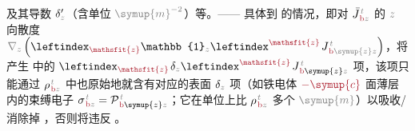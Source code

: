 及其导数 $\delta'_{\mathcolor{gray}{z}}$（含单位 $\mathcolor{gray}{\symup{m}^{-2}}$）等。—— 具体到  的情况，即对 $\bar{J}^{\;\!\mathcolor{gray}{t}}_{\;\!\textcolor{Maroon}{\text{b}}\mathcolor{gray}{z}}$ 的 $\mathcolor{gray}{z}$ 向散度 $\mathcolor{gray}{\nabla_z} \left( \leftindex_{\textcolor{Maroon}{\mathsfit{z}}} {\mathbb{1}}_{\mathcolor{gray}{z}} \leftindex^{\textcolor{Maroon}{\mathsfit{z}}} \;\! J^{\;\!\mathcolor{gray}{t}}_{\;\!\textcolor{Maroon}{\text{b}} \mathcolor{gray}{\symup{z}} \mathcolor{gray}{z}} \right)$，将产生  中的 $\leftindex_{\textcolor{Maroon}{\mathsfit{z}}} \;\! \delta_{\mathcolor{gray}{z}} \leftindex^{\textcolor{Maroon}{\mathsfit{z}}} \;\! J^{\;\!\mathcolor{gray}{t}}_{\;\!\textcolor{Maroon}{\text{b}} \symup{z} \mathcolor{gray}{z}}$ 项，该项只能通过 ${\rho}^{\;\!\mathcolor{gray}{t}}_{\;\!\textcolor{Maroon}{\text{b}}\mathcolor{gray}{z}}$ 中也原始地就含有对应的表面 $\delta_{\mathcolor{gray}{z}}$ 项（如铁电体 $\textcolor{Maroon}{-\symup{c}}$ 面薄层内的束缚电子 ${\sigma}^{\;\!\mathcolor{gray}{t}}_{\;\!\textcolor{Maroon}{\text{b}}\mathcolor{gray}{z}} = {\mathcal{P}}^{\;\!\mathcolor{gray}{t}}_{\;\!\textcolor{Maroon}{\text{b}} \symup{z} \mathcolor{gray}{z}}$；它在单位上比 ${\rho}^{\;\!\mathcolor{gray}{t}}_{\;\!\textcolor{Maroon}{\text{b}}\mathcolor{gray}{z}}$ 多个 $\mathcolor{gray}{\symup{m}}$）以吸收/消除掉 \cite{grahamMultipoleSolutionMacroscopic2000}，否则将违反 。

